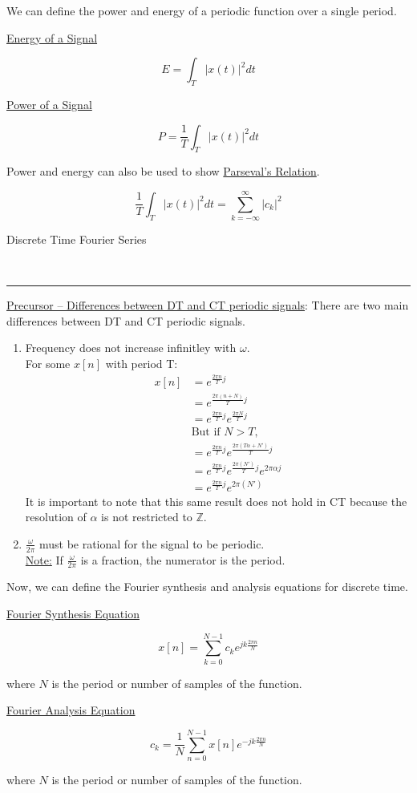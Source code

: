 \documentclass{article}
\newcommand{\header}[1]{\begin{large}\noindent #1\end{large}\\\rule{\textwidth}{0.5pt}}
\newcommand{\gap}{\medskip\\}
\newcommand{\centertext}[1]{\begin{center}#1\end{center}}
\begin{document}
We can define the power and energy of a periodic function over a single period. 
\begin{multicols}{2}
    \centertext{\underline{Energy of a Signal}}
    \[
        E = \int_T \left|x(t)\right|^2 dt    
    \]
    \vfill\null\columnbreak
    \centertext{\underline{Power of a Signal}}
    \[
        P = \frac{1}{T}\int_T \left|x(t)\right|^2 dt    
    \]
    \vfill\null
\end{multicols}

Power and energy can also be used to show \underline{Parseval's Relation}.

\[
    \frac{1}{T}\int_T\left|x(t)\right|^2 dt = \sum_{k = -\infty}^\infty |c_k|^2    
\]

\header{Discrete Time Fourier Series}
\underline{Precursor -- Differences between DT and CT periodic signals}: There are 
two main differences between DT and CT periodic signals. 
\begin{enumerate}
    \item Frequency does not increase infinitley with $\omega$.
    \smallskip\\
    For some $x[n]$ with period T:
    \begin{align*}
        x[n] &= e^{\frac{2\pi n}{T}j}\\
        &= e^{\frac{2\pi (n + N)}{T}j}\\
        &= e^{\frac{2\pi n}{T}j}e^{\frac{2\pi N}{T}j}\\
        & \textrm{But if } N > T,\\
        &= e^{\frac{2\pi n}{T}j}e^{\frac{2\pi (T\alpha + N')}{T}j}\\
        &= e^{\frac{2\pi n}{T}j}e^{\frac{2\pi (N')}{T}j}e^{{2\pi \alpha}j}\\
        &= e^{\frac{2\pi n}{T}j}e^{{2\pi (N')}}
    \end{align*}
    It is important to note that this same result does not hold in CT because the
    resolution of $\alpha$ is not restricted to $\mathbb{Z}$.
    \item $\frac{\omega}{2\pi}$ must be rational for the signal to be periodic.
    \gap
    \underline{Note:} If $\frac{\omega}{2\pi}$ is a fraction, the numerator is the period.
\end{enumerate}
Now, we can define the Fourier synthesis and analysis equations for discrete time.
\begin{multicols}{2}
    \centertext{\underline{Fourier Synthesis Equation}}
    \[
        x[n] = \sum_{k = 0}^{N - 1}c_k e^{jk \frac{2\pi n}{N}}   
    \]
    \centertext{where $N$ is the period or number of samples of the function.}
    \vfill\null\columnbreak
    \centertext{\underline{Fourier Analysis Equation}}
    \[
        c_k = \frac{1}{N}\sum_{n = 0}^{N - 1}x[n]e^{-jk \frac{2\pi n}{N}}   
    \]
    \centertext{where $N$ is the period or number of samples of the function.}
    \vfill\null
\end{multicols}
\end{document}
